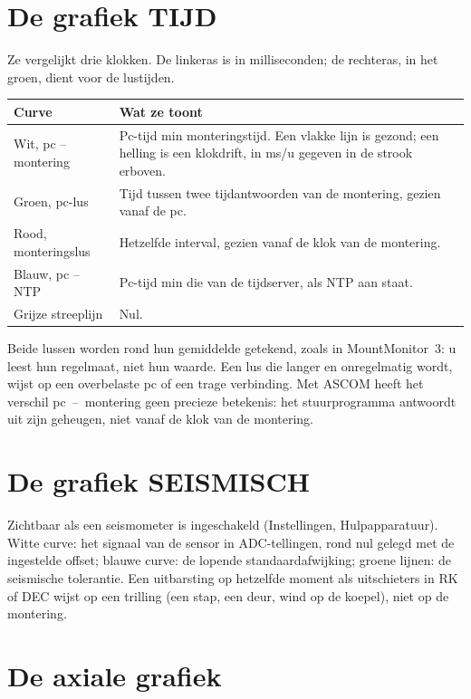 \section{De grafiek TIJD}
\label{sec:time}

Ze vergelijkt drie klokken. De linkeras is in milliseconden; de rechteras, in
het groen, dient voor de lustijden.

\begin{center}
\begin{tabularx}{\textwidth}{lX}
\toprule
\textbf{Curve} & \textbf{Wat ze toont} \\
\midrule
Wit, pc -- montering & Pc-tijd min monteringstijd. Een vlakke lijn is gezond;
een helling is een klokdrift, in ms/u gegeven in de strook erboven. \\
Groen, pc-lus & Tijd tussen twee tijdantwoorden van de montering, gezien vanaf
de pc. \\
Rood, monteringslus & Hetzelfde interval, gezien vanaf de klok van de
montering. \\
Blauw, pc -- NTP & Pc-tijd min die van de tijdserver, als NTP aan staat. \\
Grijze streeplijn & Nul. \\
\bottomrule
\end{tabularx}
\end{center}

Beide lussen worden rond hun gemiddelde getekend, zoals in MountMonitor~3: u
leest hun regelmaat, niet hun waarde. Een lus die langer en onregelmatig wordt,
wijst op een overbelaste pc of een trage verbinding. Met ASCOM heeft het
verschil pc~--~montering geen precieze betekenis: het stuurprogramma antwoordt
uit zijn geheugen, niet vanaf de klok van de montering.

\section{De grafiek SEISMISCH}
\label{sec:seismic}

Zichtbaar als een seismometer is ingeschakeld (Instellingen, Hulpapparatuur).
Witte curve: het signaal van de sensor in ADC-tellingen, rond nul gelegd met de
ingestelde offset; blauwe curve: de lopende standaardafwijking; groene lijnen:
de seismische tolerantie. Een uitbarsting op hetzelfde moment als uitschieters in
RK of DEC wijst op een trilling (een stap, een deur, wind op de koepel), niet op
de montering.

\section{De axiale grafiek}

